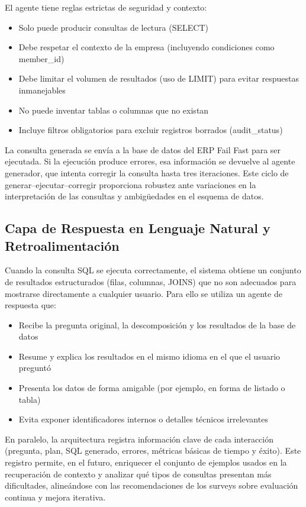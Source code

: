 \documentclass[journal]{IEEEtran}
\begin{document}
El agente tiene reglas estrictas de seguridad y contexto:
\begin{itemize}
	\item Solo puede producir consultas de lectura (SELECT)
	\item Debe respetar el contexto de la empresa (incluyendo condiciones como member\_id)
	\item Debe limitar el volumen de resultados (uso de LIMIT) para evitar respuestas inmanejables
	\item No puede inventar tablas o columnas que no existan
	\item Incluye filtros obligatorios para excluir registros borrados (audit\_status)
\end{itemize}

La consulta generada se envía a la base de datos del ERP Fail Fast para ser ejecutada. Si la ejecución produce errores, esa información se devuelve al agente generador, que intenta corregir la consulta hasta tres iteraciones. Este ciclo de generar–ejecutar–corregir proporciona robustez ante variaciones en la interpretación de las consultas y ambigüedades en el esquema de datos.

\subsection{Capa de Respuesta en Lenguaje Natural y Retroalimentación}

Cuando la consulta SQL se ejecuta correctamente, el sistema obtiene un conjunto de resultados estructurados (filas, columnas, JOINS) que no son adecuados para mostrarse directamente a cualquier usuario. Para ello se utiliza un agente de respuesta que:
\begin{itemize}
	\item Recibe la pregunta original, la descomposición y los resultados de la base de datos
	\item Resume y explica los resultados en el mismo idioma en el que el usuario preguntó
	\item Presenta los datos de forma amigable (por ejemplo, en forma de listado o tabla)
	\item Evita exponer identificadores internos o detalles técnicos irrelevantes
\end{itemize}

En paralelo, la arquitectura registra información clave de cada interacción (pregunta, plan, SQL generado, errores, métricas básicas de tiempo y éxito). Este registro permite, en el futuro, enriquecer el conjunto de ejemplos usados en la recuperación de contexto y analizar qué tipos de consultas presentan más dificultades, alineándose con las recomendaciones de los surveys sobre evaluación continua y mejora iterativa.
\end{document}
